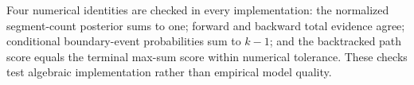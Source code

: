 Four numerical identities are checked in every implementation: the normalized segment-count posterior sums to one; forward and backward total evidence agree; conditional boundary-event probabilities sum to $k-1$; and the backtracked path score equals the terminal max-sum score within numerical tolerance. These checks test algebraic implementation rather than empirical model quality.
